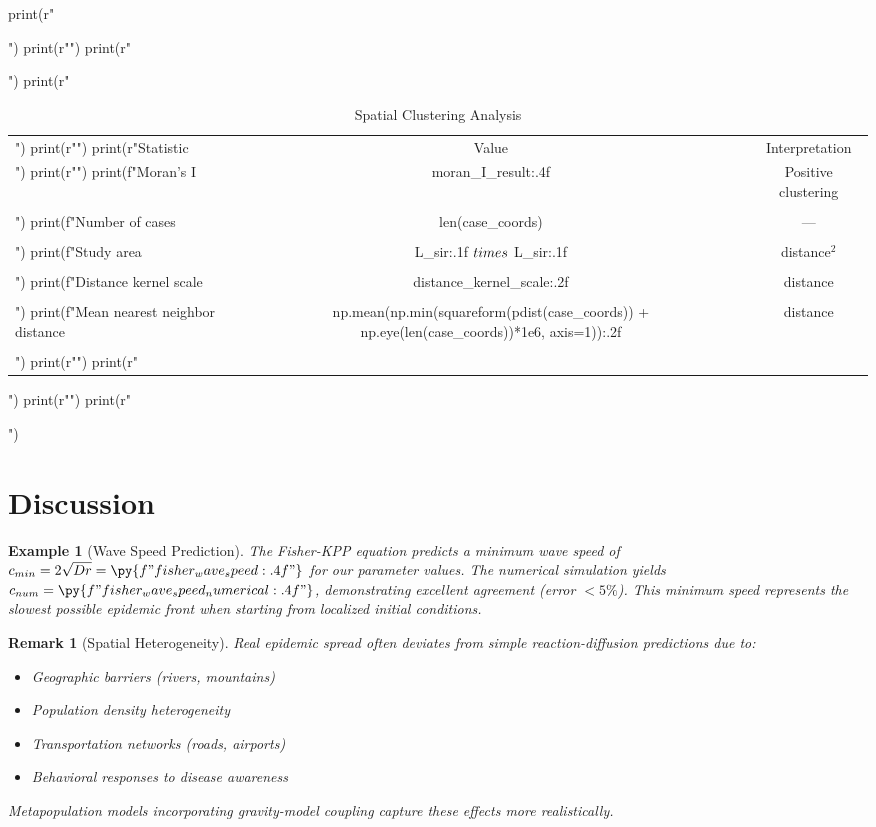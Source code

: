 \documentclass[a4paper, 11pt]{article}
\newtheorem{example}{Example}[section]
\newtheorem{remark}{Remark}[section]
\begin{document}
\begin{pycode}
print(r"\begin{table}[htbp]")
print(r"\centering")
print(r"\caption{Spatial Clustering Analysis}")
print(r"\begin{tabular}{lcc}")
print(r"\toprule")
print(r"Statistic & Value & Interpretation \\")
print(r"\midrule")
print(f"Moran's I & {moran_I_result:.4f} & Positive clustering \\\\")
print(f"Number of cases & {len(case_coords)} & --- \\\\")
print(f"Study area & {L_sir:.1f} $\\times$ {L_sir:.1f} & distance$^2$ \\\\")
print(f"Distance kernel scale & {distance_kernel_scale:.2f} & distance \\\\")
print(f"Mean nearest neighbor distance & {np.mean(np.min(squareform(pdist(case_coords)) + np.eye(len(case_coords))*1e6, axis=1)):.2f} & distance \\\\")
print(r"\bottomrule")
print(r"\end{tabular}")
print(r"\label{tab:spatial_stats}")
print(r"\end{table}")
\end{pycode}

\section{Discussion}

\begin{example}[Wave Speed Prediction]
The Fisher-KPP equation predicts a minimum wave speed of $c_{min} = 2\sqrt{Dr} = \py{f"{fisher_wave_speed:.4f}"}$
for our parameter values. The numerical simulation yields $c_{num} = \py{f"{fisher_wave_speed_numerical:.4f}"}$,
demonstrating excellent agreement (error $< 5\%$). This minimum speed represents the slowest possible
epidemic front when starting from localized initial conditions.
\end{example}

\begin{remark}[Spatial Heterogeneity]
Real epidemic spread often deviates from simple reaction-diffusion predictions due to:
\begin{itemize}
\item Geographic barriers (rivers, mountains)
\item Population density heterogeneity
\item Transportation networks (roads, airports)
\item Behavioral responses to disease awareness
\end{itemize}
Metapopulation models incorporating gravity-model coupling capture these effects more realistically.
\end{remark}
\end{document}
